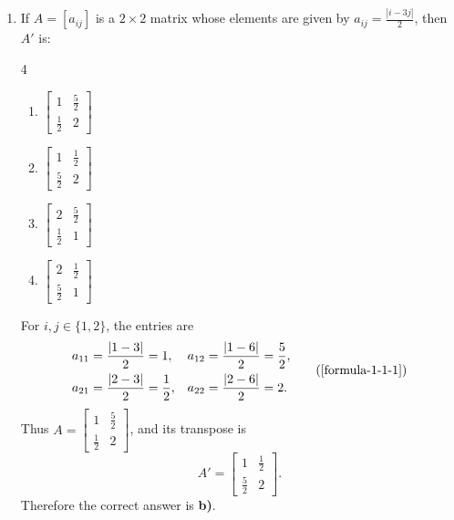 \begin{enumerate}[label={},leftmargin=1.15cm,labelwidth=1.0cm,labelsep=0.15cm,itemindent=0pt,listparindent=0pt,itemsep=\baselineskip,parsep=0pt,topsep=0pt]
\item[4.1.2] If $A=[a_{ij}]$ is a $2\times2$ matrix whose elements are given by $a_{ij}=\frac{|i-3j|}{2}$, then $A'$ is:

\begin{multicols}{4}
\begin{enumerate}
\setlength{\itemsep}{0pt}
    \item $\begin{bmatrix}1&\frac{5}{2}\\[2pt]\frac{1}{2}&2\end{bmatrix}$
    \item $\begin{bmatrix}1&\frac{1}{2}\\[2pt]\frac{5}{2}&2\end{bmatrix}$
    \item $\begin{bmatrix}2&\frac{5}{2}\\[2pt]\frac{1}{2}&1\end{bmatrix}$
    \item $\begin{bmatrix}2&\frac{1}{2}\\[2pt]\frac{5}{2}&1\end{bmatrix}$
\end{enumerate}
\end{multicols}

\vspace{0.6em}\par\solution


For $i,j\in\{1,2\}$, the entries are
\begin{equation*}
\begin{aligned}
a_{11}&=\frac{|1-3|}{2}=1, & a_{12}&=\frac{|1-6|}{2}=\frac52,\\
a_{21}&=\frac{|2-3|}{2}=\frac12, & a_{22}&=\frac{|2-6|}{2}=2.
\end{aligned}
\tag*{(\ref{formula-1-1-1})}\end{equation*}
Thus $A=\begin{bmatrix}1&\frac52\\[2pt]\frac12&2\end{bmatrix}$, and its transpose is
\[
A'=\begin{bmatrix}1&\frac12\\[2pt]\frac52&2\end{bmatrix}.
\]
Therefore the correct answer is \textbf{b)}.


\end{enumerate}
